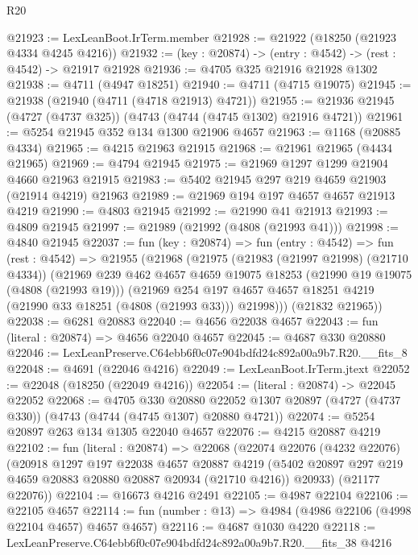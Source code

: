 \begin{lexlean}{R20}
\begin{coremodule}
@21923 := LexLeanBoot.IrTerm.member
@21928 := @21922 (@18250 (@21923 @4334 @4245 @4216))
@21932 := (key : @20874) -> (entry : @4542) -> (rest : @4542) -> @21917 @21928
@21936 := @4705 @325 @21916 @21928 @1302
@21938 := @4711 (@4947 @18251)
@21940 := @4711 (@4715 @19075)
@21945 := @21938 (@21940 (@4711 (@4718 @21913) @4721))
@21955 := @21936 @21945 (@4727 (@4737 @325)) (@4743 (@4744 (@4745 @1302) @21916 @4721))
@21961 := @5254 @21945 @352 @134 @1300 @21906 @4657
@21963 := @1168 (@20885 @4334)
@21965 := @4215 @21963 @21915
@21968 := @21961 @21965 (@4434 @21965)
@21969 := @4794 @21945
@21975 := @21969 @1297 @1299 @21904 @4660 @21963 @21915
@21983 := @5402 @21945 @297 @219 @4659 @21903 (@21914 @4219) @21963
@21989 := @21969 @194 @197 @4657 @4657 @21913 @4219
@21990 := @4803 @21945
@21992 := @21990 @41 @21913
@21993 := @4809 @21945
@21997 := @21989 (@21992 (@4808 (@21993 @41)))
@21998 := @4840 @21945
@22037 := fun (key : @20874) =>
  fun (entry : @4542) =>
  fun (rest : @4542) =>
  @21955
    (@21968
      (@21975
        (@21983 (@21997 @21998) (@21710 @4334))
        (@21969
          @239
          @462
          @4657
          @4659
          @19075
          @18253
          (@21990 @19 @19075 (@4808 (@21993 @19)))
          (@21969
            @254
            @197
            @4657
            @4657
            @18251
            @4219
            (@21990 @33 @18251 (@4808 (@21993 @33)))
            @21998)))
      (@21832 @21965))
@22038 := @6281 @20883
@22040 := @4656 @22038 @4657
@22043 := fun (literal : @20874) => @4656 @22040 @4657
@22045 := @4687 @330 @20880
@22046 := LexLeanPreserve.C64ebb6f0c07e904bdfd24c892a00a9b7.R20.__fits_8
@22048 := @4691 (@22046 @4216)
@22049 := LexLeanBoot.IrTerm.jtext
@22052 := @22048 (@18250 (@22049 @4216))
@22054 := (literal : @20874) -> @22045 @22052
@22068 := @4705
    @330
    @20880
    @22052
    @1307
    @20897
    (@4727 (@4737 @330))
    (@4743 (@4744 (@4745 @1307) @20880 @4721))
@22074 := @5254 @20897 @263 @134 @1305 @22040 @4657
@22076 := @4215 @20887 @4219
@22102 := fun (literal : @20874) =>
  @22068
    (@22074
      @22076
      (@4232 @22076)
      (@20918
        @1297
        @197
        @22038
        @4657
        @20887
        @4219
        (@5402 @20897 @297 @219 @4659 @20883 @20880 @20887 @20934 (@21710 @4216))
        @20933)
      (@21177 @22076))
@22104 := @16673 @4216 @2491
@22105 := @4987 @22104
@22106 := @22105 @4657
@22114 := fun (number : @13) => @4984 (@4986 @22106 (@4998 @22104 @4657) @4657 @4657)
@22116 := @4687 @1030 @4220
@22118 := LexLeanPreserve.C64ebb6f0c07e904bdfd24c892a00a9b7.R20.__fits_38 @4216

\end{coremodule}
\end{lexlean}
